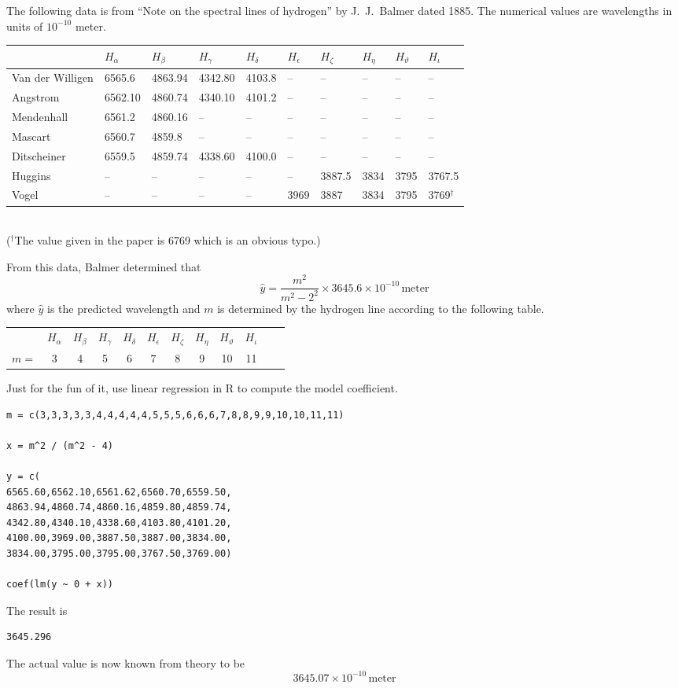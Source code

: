 \documentclass[12pt]{article}
\begin{document}
\noindent
The following data is from
``Note on the spectral lines of hydrogen''
by J.~J.~Balmer dated 1885.
The numerical values are wavelengths in units of $10^{-10}$ meter.

\begin{center}
\footnotesize
\begin{tabular}{|l|l|l|l|l|l|l|l|l|l|}
\hline
 & $H_\alpha$ & $H_\beta$ & $H_\gamma$ & $H_\delta$ & $H_\epsilon$ &
$H_\zeta$ & $H_\eta$ & $H_\vartheta$ & $H_\iota$
\\
\hline
Van der Willigen & 6565.6 & 4863.94 & 4342.80 & 4103.8 & -- & -- & -- & -- & --
\\
Angstrom & 6562.10 & 4860.74 & 4340.10 & 4101.2 & -- & -- & -- & -- & --
\\
Mendenhall & 6561.2 & 4860.16 & -- & -- & -- & -- & -- & -- & --
\\
Mascart & 6560.7 & 4859.8 & -- & -- & -- & -- & -- & -- & --
\\
Ditscheiner & 6559.5 & 4859.74 & 4338.60 & 4100.0 & -- & -- & -- & -- & --
\\
Huggins & -- & -- & -- & -- & -- & 3887.5 & 3834 & 3795 & 3767.5
\\
Vogel & -- & -- & -- & -- & 3969 & 3887 & 3834 & 3795 & 3769${}^\dag$
\\
\hline
\end{tabular}
\\
{\footnotesize(${}^\dag$The value given in the paper is 6769 which is an obvious typo.)}
\end{center}

\noindent
From this data, Balmer determined that
\begin{equation*}
\hat{y}=\frac{m^2}{m^2-2^2}\times3645.6\times10^{-10}\,\text{meter}
\end{equation*}
where $\hat{y}$ is the predicted wavelength and $m$ is determined by the hydrogen line
according to the following table.
\begin{center}
\begin{tabular}{cccccccccccc}
& $H_\alpha$ & $H_\beta$ & $H_\gamma$ & $H_\delta$ & $H_\epsilon$ &
$H_\zeta$ & $H_\eta$ & $H_\vartheta$ & $H_\iota$
\\
$m=$ & 3 & 4 & 5 & 6 & 7 & 8 & 9 & 10 & 11
\end{tabular}
\end{center}

\noindent
Just for the fun of it, use linear regression in R to compute the model coefficient.
{\footnotesize\color{blue}
\begin{verbatim}
m = c(3,3,3,3,3,4,4,4,4,4,5,5,5,6,6,6,7,8,8,9,9,10,10,11,11)

x = m^2 / (m^2 - 4)

y = c(
6565.60,6562.10,6561.62,6560.70,6559.50,
4863.94,4860.74,4860.16,4859.80,4859.74,
4342.80,4340.10,4338.60,4103.80,4101.20,
4100.00,3969.00,3887.50,3887.00,3834.00,
3834.00,3795.00,3795.00,3767.50,3769.00)

coef(lm(y ~ 0 + x))
\end{verbatim}
}

\noindent
The result is
{\footnotesize
\begin{verbatim}
3645.296 
\end{verbatim}
}

\noindent
The actual value is now known from theory to be
\begin{equation*}
3645.07\times10^{-10}\,\text{meter}
\end{equation*}
\end{document}
